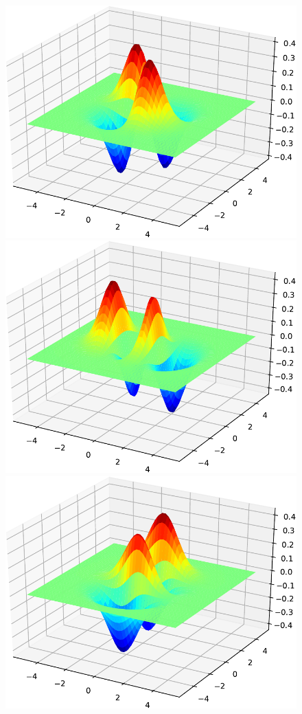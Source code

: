 \begin{figure}[H]
{\includegraphics[scale=0.3]{../codes/sch_2d/IMG_harmonic_psi_6.pdf}\\
\includegraphics[scale=0.3]{../codes/sch_2d/IMG_harmonic_psi_7.pdf}%
\includegraphics[scale=0.3]{../codes/sch_2d/IMG_harmonic_psi_8.pdf}%
}
\end{figure}
